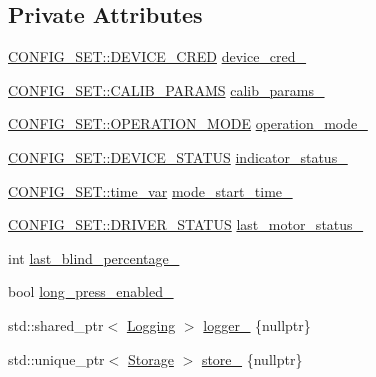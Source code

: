 \subsection*{Private Attributes}
\begin{DoxyCompactItemize}
\item 
\hyperlink{structCONFIG__SET_1_1DEVICE__CRED}{C\+O\+N\+F\+I\+G\+\_\+\+S\+E\+T\+::\+D\+E\+V\+I\+C\+E\+\_\+\+C\+R\+ED} \hyperlink{classController_a9ed021fc747dcc7fe46612cf40792835}{device\+\_\+cred\+\_\+}
\item 
\hyperlink{structCONFIG__SET_1_1CALIB__PARAMS}{C\+O\+N\+F\+I\+G\+\_\+\+S\+E\+T\+::\+C\+A\+L\+I\+B\+\_\+\+P\+A\+R\+A\+MS} \hyperlink{classController_a155543a3a5477481b42d4742a2738d2e}{calib\+\_\+params\+\_\+}
\item 
\hyperlink{namespaceCONFIG__SET_ac5c2592b79bead7e6497c37cddc401e6}{C\+O\+N\+F\+I\+G\+\_\+\+S\+E\+T\+::\+O\+P\+E\+R\+A\+T\+I\+O\+N\+\_\+\+M\+O\+DE} \hyperlink{classController_aac6fbfee448aed573ac0c351061474ee}{operation\+\_\+mode\+\_\+}
\item 
\hyperlink{namespaceCONFIG__SET_a8379cbe9f81ee38829b156f47261081a}{C\+O\+N\+F\+I\+G\+\_\+\+S\+E\+T\+::\+D\+E\+V\+I\+C\+E\+\_\+\+S\+T\+A\+T\+US} \hyperlink{classController_ac86e092267490730d908b88a44d1ebfd}{indicator\+\_\+status\+\_\+}
\item 
\hyperlink{namespaceCONFIG__SET_a8816a22e7885d027a52bfa0d24fa9008}{C\+O\+N\+F\+I\+G\+\_\+\+S\+E\+T\+::time\+\_\+var} \hyperlink{classController_aa144ead03579e6426e3f81ac0326c29d}{mode\+\_\+start\+\_\+time\+\_\+}
\item 
\hyperlink{namespaceCONFIG__SET_a722f4ba49e35faf1a2504aa23677b2f0}{C\+O\+N\+F\+I\+G\+\_\+\+S\+E\+T\+::\+D\+R\+I\+V\+E\+R\+\_\+\+S\+T\+A\+T\+US} \hyperlink{classController_a93d14e8edbc5cf7b3ee28ec5c9054576}{last\+\_\+motor\+\_\+status\+\_\+}
\item 
int \hyperlink{classController_a4ede51f4305e6048d3b41e8543d11628}{last\+\_\+blind\+\_\+percentage\+\_\+}
\item 
bool \hyperlink{classController_ae880908cc2bea7c5e06c1c00e14407e2}{long\+\_\+press\+\_\+enabled\+\_\+}
\item 
std\+::shared\+\_\+ptr$<$ \hyperlink{classLogging}{Logging} $>$ \hyperlink{classController_aecfe98e4757879d331d44e07954c5c56}{logger\+\_\+} \{nullptr\}
\item 
std\+::unique\+\_\+ptr$<$ \hyperlink{classStorage}{Storage} $>$ \hyperlink{classController_a0b119887316779a66a171650000304d4}{store\+\_\+} \{nullptr\}
\item 

\end{DoxyCompactItemize}
